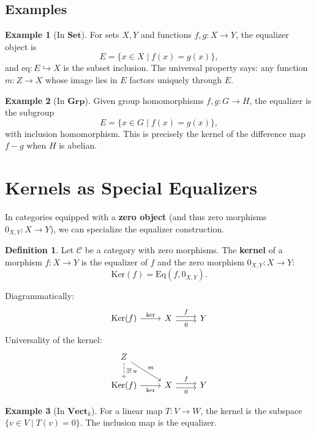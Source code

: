 \documentclass{article}
\theoremstyle{definition}
\newtheorem{definition}{Definition}[section]
\newtheorem{example}{Example}[section]
\begin{document}
\subsection{Examples}
\begin{example}[In $\mathbf{Set}$]
For sets $X, Y$ and functions $f, g : X \to Y$, the equalizer object is
\[
E = \{ x \in X \mid f(x) = g(x) \},
\]
and $\mathrm{eq} : E \hookrightarrow X$ is the subset inclusion. The universal property says: any function $m : Z \to X$ whose image lies in $E$ factors uniquely through $E$.
\end{example}

\begin{example}[In $\mathbf{Grp}$]
Given group homomorphisms $f, g : G \to H$, the equalizer is the subgroup
\[
E = \{ x \in G \mid f(x) = g(x) \},
\]
with inclusion homomorphism. This is precisely the kernel of the difference map $f - g$ when $H$ is abelian.
\end{example}

\section{Kernels as Special Equalizers}
In categories equipped with a \textbf{zero object} (and thus zero morphisms $0_{X,Y} : X \to Y$), we can specialize the equalizer construction.

\begin{definition}
Let $\mathcal{C}$ be a category with zero morphisms. The \textbf{kernel} of a morphism $f : X \to Y$ is the equalizer of $f$ and the zero morphism $0_{X,Y} : X \to Y$:
\[
\mathrm{Ker}(f) = \mathrm{Eq}(f, 0_{X,Y}).
\]
\end{definition}

Diagrammatically:
\[
\begin{tikzcd}
\mathrm{Ker}(f) \arrow[r, "\mathrm{ker}"] & X \arrow[r, shift left, "f"] \arrow[r, shift right, "0"'] & Y
\end{tikzcd}
\]
Universality of the kernel:
\[
\begin{tikzcd}
Z \arrow[dr, "m"] \arrow[d, dashed, "\exists!\, u"] & \\
\mathrm{Ker}(f) \arrow[r, "\mathrm{ker}"'] & X \arrow[r, shift left, "f"] \arrow[r, shift right, "0"'] & Y
\end{tikzcd}
\]

\begin{example}[In $\mathbf{Vect}_k$]
For a linear map $T : V \to W$, the kernel is the subspace $\{ v \in V \mid T(v) = 0 \}$. The inclusion map is the equalizer.
\end{example}
\end{document}

